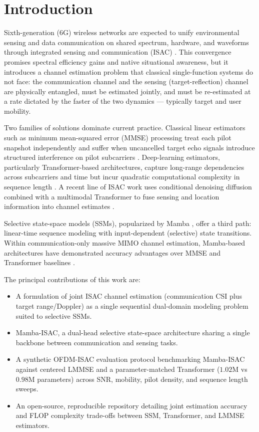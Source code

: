 \documentclass[conference]{IEEEtran}
\begin{document}
\section{Introduction}

Sixth-generation (6G) wireless networks are expected to unify environmental sensing and data communication on shared spectrum, hardware, and waveforms through integrated sensing and communication (ISAC) \cite{rohde_isac, shtaiwi_otfs_survey}. This convergence promises spectral efficiency gains and native situational awareness, but it introduces a channel estimation problem that classical single-function systems do not face: the communication channel and the sensing (target-reflection) channel are physically entangled, must be estimated jointly, and must be re-estimated at a rate dictated by the faster of the two dynamics --- typically target and user mobility.

Two families of solutions dominate current practice. Classical linear estimators such as minimum mean-squared error (MMSE) processing treat each pilot snapshot independently and suffer when uncancelled target echo signals introduce structured interference on pilot subcarriers \cite{bjornson_mmse_cellfree}. Deep-learning estimators, particularly Transformer-based architectures, capture long-range dependencies across subcarriers and time but incur quadratic computational complexity in sequence length \cite{xu_transformer_csi, bi_conv_transformer}. A recent line of ISAC work uses conditional denoising diffusion combined with a multimodal Transformer to fuse sensing and location information into channel estimates \cite{farzanullah_isac_diffusion}.

Selective state-space models (SSMs), popularized by Mamba \cite{gu_mamba}, offer a third path: linear-time sequence modeling with input-dependent (selective) state transitions. Within communication-only massive MIMO channel estimation, Mamba-based architectures have demonstrated accuracy advantages over MMSE and Transformer baselines \cite{mambanet, cpmamba, channelmamba, mambacsp}.

The principal contributions of this work are:
\begin{itemize}
\item A formulation of joint ISAC channel estimation (communication CSI plus target range/Doppler) as a single sequential dual-domain modeling problem suited to selective SSMs.
\item Mamba-ISAC, a dual-head selective state-space architecture sharing a single backbone between communication and sensing tasks.
\item A synthetic OFDM-ISAC evaluation protocol benchmarking Mamba-ISAC against centered LMMSE and a parameter-matched Transformer ($1.02\text{M}$ vs $0.98\text{M}$ parameters) across SNR, mobility, pilot density, and sequence length sweeps.
\item An open-source, reproducible repository detailing joint estimation accuracy and FLOP complexity trade-offs between SSM, Transformer, and LMMSE estimators.
\end{itemize}
\end{document}
